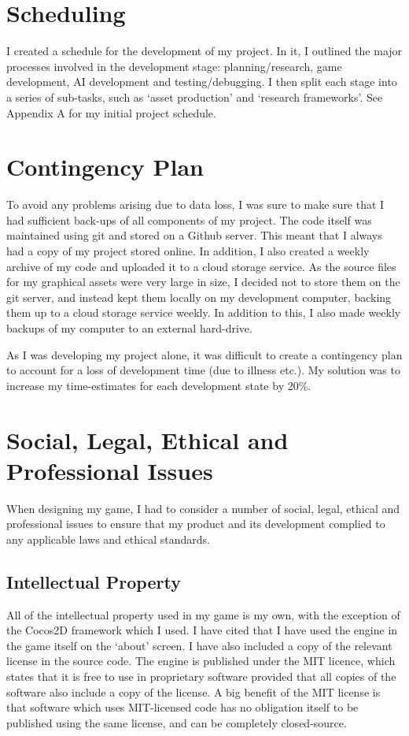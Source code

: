 \documentclass[a4paper,oneside]{report}
\begin{document}
\newpage
\section{Scheduling}

I created a schedule for the development of my project. In it, I outlined the major processes involved in the development stage: planning/research, game development, AI development and testing/debugging. I then split each stage into a series of sub-tasks, such as `asset production' and `research frameworks'. See Appendix A for my initial project schedule.

\section{Contingency Plan}

To avoid any problems arising due to data loss, I was sure to make sure that I had sufficient back-ups of all components of my project. The code itself was maintained using git and stored on a Github server. This meant that I always had a copy of my project stored online. In addition, I also created a weekly archive of my code and uploaded it to a cloud storage service. As the source files for my graphical assets were very large in size, I decided not to store them on the git server, and instead kept them locally on my development computer, backing them up to a cloud storage service weekly. In addition to this, I also made weekly backups of my computer to an external hard-drive.

As I was developing my project alone, it was difficult to create a contingency plan to account for a loss of development time (due to illness etc.). My solution was to increase my time-estimates for each development state by 20\%.
	
\section{Social, Legal, Ethical and Professional Issues}

When designing my game, I had to consider a number of social, legal, ethical and professional issues to ensure that my product and its development complied to any applicable laws and ethical standards.

\subsection{Intellectual Property}

All of the intellectual property used in my game is my own, with the exception of the Cocos2D framework which I used. I have cited that I have used the engine in the game itself on the `about' screen. I have also included a copy of the relevant license in the source code. The engine is published under the MIT licence, which states that it is free to use in proprietary software provided that all copies of the software also include a copy of the license. A big benefit of the MIT license is that software which uses MIT-licensed code has no obligation itself to be published using the same license, and can be completely closed-source.
\end{document}
